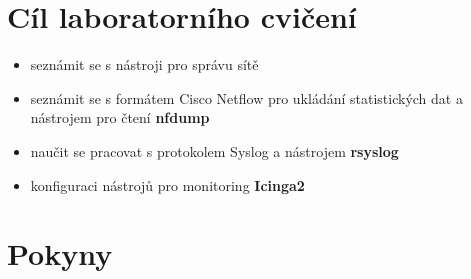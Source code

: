 %
\section*{Cíl laboratorního cvičení}
\begin{itemize}
  \item seznámit se s nástroji pro správu sítě
  \item seznámit se s formátem Cisco Netflow pro ukládání statistických dat a nástrojem pro čtení {\bf nfdump}
  \item naučit se pracovat s protokolem Syslog a nástrojem {\bf rsyslog}
  \item konfiguraci nástrojů pro monitoring {\bf Icinga2}
\end{itemize}

\section*{Pokyny}
